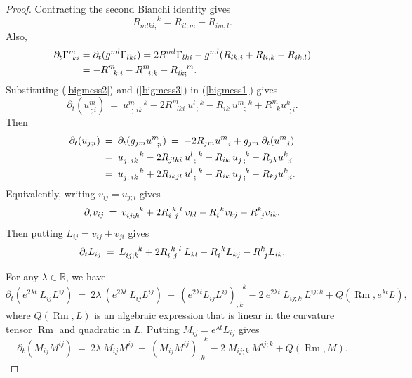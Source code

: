 \documentclass[12pt]{amsart}
\newcommand{\R}{{\mathbb R}}
\newcommand{\Rm}{\operatorname{Rm}}
\numberwithin{equation}{section}
\theoremstyle{plain}
\theoremstyle{definition}
\theoremstyle{remark}
\begin{document}
\begin{proof}
Contracting the second Bianchi identity gives
\begin{equation} \label{bigmess2}
R_{mlki;}^{\: \: \: \: \: \: \: \: \: \: \: k} = R_{il;m} - R_{im;l}.
\end{equation}
Also,
\begin{align} \label{bigmess3}
\partial_t \Gamma^m_{\: \: ki} & = \partial_t ( g^{ml} \Gamma_{lki}) = 
2 R^{ml} \Gamma_{lki} - g^{ml} (R_{lk,i} + R_{li,k} - R_{ik,l}) \\
& = - R^m_{\: \: \: k;i} - R^m_{\: \: \: i;k} + 
R^{\: \: \: \: \: m}_{ik;}.  \notag
\end{align}
Substituting (\ref{bigmess2}) and (\ref{bigmess3}) in (\ref{bigmess1})
gives
\begin{equation}
\partial_t (u^m_{\: ; i}) \: = \:
u^{m \: \: \: \: \: \: k}_{\: \: ;\:ik} -
2 R^m_{\: \: \: lki} \: u^{l \: \: \: k}_{\: \: ;} - R_{ik} \: 
u^{m \: \: \: k}_{\: \: \: \: ;} +
R^m_{\: \: \: k} u^k_{\: \: ;i}.
\end{equation}
Then
\begin{align}
\partial_t (u_{j ; i}) \: & = \:
\partial_t (g_{jm} u^m_{\: \: \: ; i}) \: = \:
-2 R_{jm} u^m_{\: \: \: ; i} + g_{jm} \: \partial_t (u^m_{\: \: \: ; i}) \\ 
& = \: 
u^{\: \: \: \: \: \: \: \: \: k}_{j  ;\:ik} -
2 R_{jlki} \: u^{l \: \: \: k}_{\: \: ;} - R_{ik} \: 
u^{\: \: \: \: k}_{j  \: ;} -
R_{jk} u^k_{\: \: ;i} \notag \\ 
& = \: 
u^{\: \: \: \: \: \: \: \: \: k}_{j  ;\:ik} +
2 R_{ikjl} \: u^{l \: \: \: k}_{\: \: ;} - R_{ik} \: 
u^{\: \: \: \: k}_{j  \: ;} -
R_{kj} u^k_{\: \: ;i}. \notag
\end{align}
Equivalently, writing $v_{ij} = u_{j ; i}$ gives
\begin{equation}
\partial_t v_{ij} \:  = \:
v^{\: \: \: \: \: \: \: k}_{ij  ;k} +
2 R^{\: \: k \: \: l}_{i \: \: j} \: v_{kl} - R_{i}^{\: \: k}
v_{kj} -
R^k_{\: \: j} v_{ik}. \notag
\end{equation}
Then putting $L_{ij} = v_{ij} + v_{ji}$ gives
\begin{equation}
\partial_t L_{ij} \:  = \:
L_{ij;k}^{\: \: \: \: \: \: \: k} +
2 R^{\: \: k \: \: l}_{i \: \: j} \: L_{kl} - R_{i}^{\: \: k} 
L_{kj} -
R^k_{\: \: j} L_{ik}.  \notag
\end{equation}

For any $\lambda \in \R$, we have
\begin{equation}
\partial_t (e^{2\lambda t} \: L_{ij} L^{ij}) \:  = \:
2 \lambda \: (e^{2\lambda t} \: L_{ij} L^{ij}) \: + \:
(e^{2\lambda t} L_{ij} L^{ij})_{;k}^{\: \: \: \: k} -
2 \: e^{2\lambda t} \: L_{ij;k} \: L^{ij;k} + Q(\Rm, e^{\lambda t}L),
\end{equation}
where $Q(\Rm, L)$ is an algebraic expression that is 
linear in the curvature tensor $\Rm$ and
quadratic in $L$.
Putting $M_{ij} = e^{\lambda t}L_{ij}$ gives
\begin{equation} \label{M2}
\partial_t (M_{ij} M^{ij}) \:  = \:
2 \lambda \: M_{ij} M^{ij} \: + \:
(M_{ij} M^{ij})_{;k}^{\: \: \: \: k} -
2 \: M_{ij;k} \: M^{ij;k} + Q(\Rm, M).
\end{equation}


\end{proof}
\end{document}
